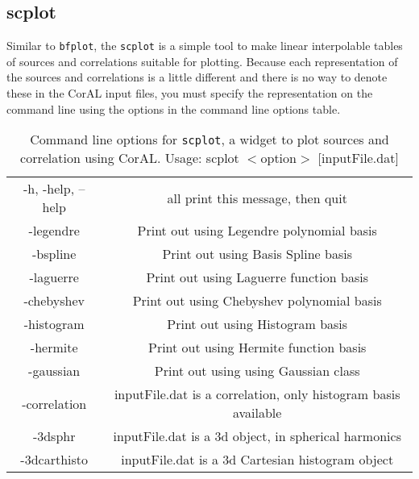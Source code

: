 \documentclass[10pt]{article}
\begin{document}
\subsection{scplot}
Similar to {\tt bfplot}, the {\tt scplot} is a simple tool to make linear interpolable tables of sources and correlations suitable for plotting.  Because each representation of the sources and correlations is a little different and there is no way to denote these in the CorAL input files, you must specify the representation on the command line using the options in the command line options table.

	\begin{table}
	\caption{Command line options for {\tt scplot}, a widget to plot sources and correlation using CorAL.  Usage: scplot $<$option$>$ [inputFile.dat]}
	\begin{center}
	\begin{tabular}{|c|c|}
		-h, -help, --help &  all print this message, then quit\\
		-legendre       	& Print out using Legendre polynomial basis\\
		-bspline        	& Print out using Basis Spline basis\\
		-laguerre       	& Print out using Laguerre function basis\\
		-chebyshev      & Print out using Chebyshev polynomial basis\\
		-histogram      	& Print out using Histogram basis\\
		-hermite        	& Print out using Hermite function basis\\
		-gaussian       	& Print out using using Gaussian class\\
		-correlation    	& inputFile.dat is a correlation, only histogram basis available\\
		-3dsphr         	& inputFile.dat is a 3d object, in spherical harmonics\\
		-3dcarthisto    	& inputFile.dat is a 3d Cartesian histogram object
	\end{tabular}
	\end{center}
	\label{default}
	\end{table}%
\end{document}
